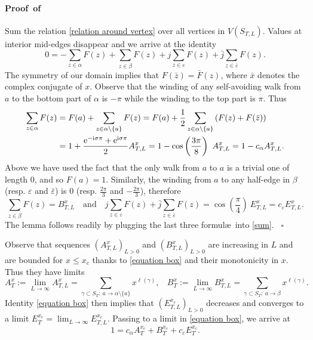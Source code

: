 \documentclass[a4paper,oneside,12pt]{article}
\newcommand{\g}{\gamma}
\newcommand{\e}{{\rm e}}
\newcommand{\I}{{\rm i}}
\newcommand{\ep}{\varepsilon}
\newenvironment{proof}[1][\relax]%
  {\paragraph{Proof\ifx#1\relax\else~of #1\fi}}%
  {~\hfill$\square$\par\bigskip}
\begin{document}
\begin{proof}
Sum the relation \eqref{relation around vertex} over all vertices in $V(S_{T,L})$. Values at interior mid-edges disappear and we arrive at the identity
\begin{equation}\label{sum}
	0=-\sum_{z\in \alpha}F(z)+\sum_{z\in \beta}F(z)+j\sum_{z\in \ep}F(z)+\bar{j}\sum_{z\in \bar{\ep}}F(z).
\end{equation}
The symmetry of our domain implies that $F(\bar{z})=\bar{F}(z)$, 
where $\bar{x}$ denotes the complex conjugate of $x$.
Observe that the winding of any self-avoiding walk from $a$ to the bottom part of $\alpha$ is $-\pi$ while the winding to the top part is $\pi$. Thus
\begin{align*}
	\sum_{z\in \alpha}F(z)&=F(a)+\sum_{z\in \alpha\setminus \{a\}}F(z)
=F(a)+\frac12\sum_{z\in \alpha\setminus \{a\}}\left(F(z)+F(\bar z)\right)\\
&=1+\frac{\e^{-\I\sigma \pi}+\e^{\I\sigma \pi}}{2}A^x_{T,L}=1-\cos \left(\frac{3\pi}{8}\right)\ A^x_{T,L}=1-c_{\alpha}A^x_{T,L}.
\end{align*}
Above we have used the fact that the only walk from $a$ to $a$ is a trivial one
of length $0$, and so $F(a)=1$. Similarly, the winding from $a$ to any half-edge in $\beta$ (resp. $\ep$ and $\bar{\ep}$) is 0 (resp. $\frac {2\pi}3$ and $-\frac{2\pi}3$), therefore 
$$\sum_{z\in \beta}F(z)=B^x_{T,L}\quad \text{and}\quad j\sum_{z\in \ep}F(z)+\bar{j}\sum_{z\in \bar{\ep}}F(z)=\cos  \left(\frac\pi 4\right)\  E^x_{T,L}=c_{\ep}E^x_{T,L}.$$
The lemma follows readily by plugging the last three formul\ae\ into \eqref{sum}.
\end{proof}

Observe that sequences $(A^x_{T,L})_{L>0}$ and $(B^x_{T,L})_{L>0}$ are increasing in $L$ and are bounded for $x\leq x_c$ thanks 
to \eqref{equation box} and their monotonicity in $x$. Thus they have limits
$$
	A^x_T:=\lim_{L\rightarrow \infty}A^x_{T,L}=\sum_{\g\subset S_T:\ a\rightarrow\alpha\setminus \{a\}} x^{\ell(\g)},~~~~
	B^x_T:=\lim_{L\rightarrow \infty}B^x_{T,L}=\sum_{\g\subset S_T:\ a\rightarrow \beta} x^{\ell(\g)}.
$$
Identity \eqref{equation box} then implies that $(E^{x_c}_{T,L})_{L>0}$ decreases and converges to a limit $E^{x_c}_T=\lim_{L\rightarrow \infty}E^{x_c}_{T,L}$. 
Passing to a limit in \eqref{equation box}, we arrive at
\begin{equation}\label{equation strip}
	1=c_{\alpha}A^{x_c}_T+B^{x_c}_T+c_{\ep}E^{x_c}_T.
\end{equation}
  
\end{document}
